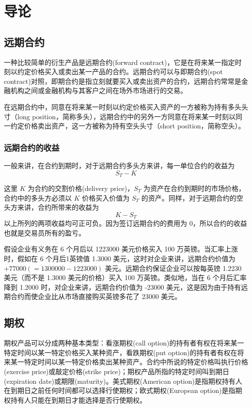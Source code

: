\chapter{导论\label{ch01}}
\section{远期合约}
一种比较简单的衍生产品是远期合约(forward contract)，它是在将来某一指定时刻以约定价格买入或卖出某一产品的合约。远期合约可以与即期合约(spot contract)对照，即期合约是指立刻就要买入或卖出资产的合约，远期合约常常是金融机构之间或金融机构与其客户之间在场外市场进行的交易。

在远期合约中，同意在将来某一时刻以约定价格买入资产的一方被称为持有多头头寸（long position，简称多头），远期合约中的另外一方同意在将来某一时刻以同一约定价格卖出资产，这一方被称为持有空头头寸（short position，简称空头）。
\subsection{远期合约的收益}
一般来讲，在合约到期时，对于远期合约多头方来讲，每一单位合约的收益为
$$S_T-K$$

这里 $K$ 为合约的交割价格(delivery price)，$S_T$ 为资产在合约到期时的市场价格，合约中的多头方必须以 $K$ 价格买入价值为 $S_T$ 的资产。同样，对于远期合约的空头方来讲，合约所带来的收益为
$$K-S_T$$
以上所列的两项收益均可正可负。因为签订远期合约的费用为 0，所以合约的收益也就是交易员所有的盈亏。

假设企业有义务在 6 个月后以 1223000 美元价格买入 100 万英镑。当汇率上涨时，假如在 6 个月后1英镑值 1.3000 美元，这时对企业来讲，远期合约价值为 $+77000(=1300000-1223000)$ 美元。远期合约保证企业可以按每英镑 1.2230 美元（而不是 1.3000 美元的价格）买入 100 万英镑。类似地，当在 6 个月后汇率降到 1.2000 时，对企业来讲，远期合约价值为 -23000 美元，这是因为由于持有远期合约而使企业比从市场直接购买英镑多花了 23000 美元。

\section{期权}
期权产品可以分成两种基本类型：看涨期权(call option)的持有者有权在将来某一特定时间以某一特定价格买入某种资产，看跌期权(put option)的持有者有权在将来某一特定时间以某一特定价格卖出某种资产。合约中所说的特定价格叫执行价格(exercise price)或敲定价格(strike price)；期权产品所指的特定时间叫到期日(expiration date)或期限(maturity)。美式期权(American option)是指期权持有人在到期日之前任何时间都可以选择行使期权；欧式期权(European option)是指期权持有人只能在到期日才能选择是否行使期权。

